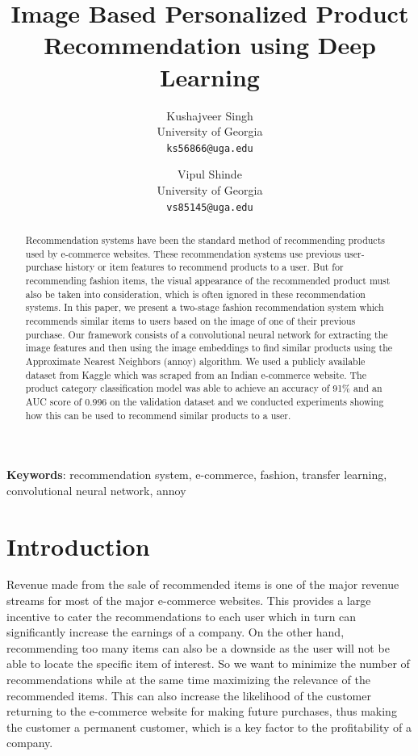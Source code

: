 \documentclass[12pt,twocolumn,letterpaper,Times New Roman]{article}
\begin{document}
\title{Image Based Personalized Product Recommendation using Deep Learning}

\author{Kushajveer Singh\\
University of Georgia\\
{\tt\small ks56866@uga.edu}
\and
Vipul Shinde\\
University of Georgia\\
{\tt\small vs85145@uga.edu}
}
\maketitle

\begin{abstract}
Recommendation systems have been the standard method of recommending products used by e-commerce websites. These recommendation systems use previous user-purchase history or item features to recommend products to a user. But for recommending fashion items, the visual appearance of the recommended product must also be taken into consideration, which is often ignored in these recommendation systems. In this paper, we present a two-stage fashion recommendation system which recommends similar items to users based on the image of one of their previous purchase. Our framework consists of a convolutional neural network for extracting the image features and then using the image embeddings to find similar products using the Approximate Nearest Neighbors (annoy) algorithm. We used a publicly available dataset from Kaggle which was scraped from an Indian e-commerce website. The product category classification model was able to achieve an accuracy of 91\% and an AUC score of 0.996 on the validation dataset and we conducted experiments showing how this can be used to recommend similar products to a user. 
\end{abstract}

\textbf{Keywords}: recommendation system, e-commerce, fashion, transfer learning, convolutional neural network, annoy

\section{Introduction}
Revenue made from the sale of recommended items is one of the major revenue streams for most of the major e-commerce websites. This provides a large incentive to cater the recommendations to each user which in turn can significantly increase the earnings of a company. On the other hand, recommending too many items can also be a downside as the user will not be able to locate the specific item of interest. So we want to minimize the number of recommendations while at the same time maximizing the relevance of the recommended items. This can also increase the likelihood of the customer returning to the e-commerce website for making future purchases, thus making the customer a permanent customer, which is a key factor to the profitability of a company.
\end{document}
